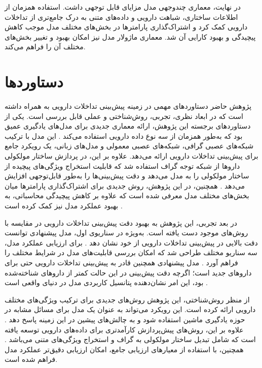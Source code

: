 در نهایت، معماری چندوجهی مدل مزایای قابل توجهی داشت. استفاده همزمان از اطلاعات ساختاری، شباهت دارویی و داده‌های متنی به درک جامع‌تری از تداخلات دارویی کمک کرد و اشتراک‌گذاری پارامترها در بخش‌های مختلف مدل موجب کاهش پیچیدگی و بهبود کارایی آن شد. معماری ماژولار مدل نیز امکان بهبود و تغییر بخش‌های مختلف آن را فراهم می‌کند.

\section{دستاوردها}

پژوهش حاضر دستاوردهای مهمی در زمینه پیش‌بینی تداخلات دارویی به همراه داشته است که در ابعاد نظری، تجربی، روش‌شناختی و عملی قابل بررسی است. یکی از دستاوردهای برجسته این پژوهش، ارائه معماری جدیدی برای مدل‌های یادگیری عمیق بود که به‌طور همزمان از سه نوع داده دارویی استفاده می‌کند \cite{ref_li2023}. این مدل با ترکیب شبکه‌های عصبی گرافی، شبکه‌های عصبی معمولی و مدل‌های زبانی، یک رویکرد جامع برای پیش‌بینی تداخلات دارویی ارائه می‌دهد. علاوه بر این، در پردازش ساختار مولکولی داروها از شبکه توجه گراف استفاده شد که قابلیت استخراج ویژگی‌های پیچیده از ساختار مولکولی را به مدل می‌دهد و دقت پیش‌بینی‌ها را به‌طور قابل‌توجهی افزایش می‌دهد \cite{ref_nyamabo2021}. همچنین، در این پژوهش، روش جدیدی برای اشتراک‌گذاری پارامترها میان بخش‌های مختلف مدل معرفی شده است که علاوه بر کاهش پیچیدگی محاسباتی، به بهبود عملکرد مدل نیز کمک کرده است \cite{ref_dai2020}.

در بعد تجربی، این پژوهش به بهبود دقت پیش‌بینی تداخلات دارویی در مقایسه با روش‌های موجود دست یافته است. به‌ویژه در سناریوی اول، مدل پیشنهادی توانست دقت بالایی در پیش‌بینی تداخلات دارویی از خود نشان دهد \cite{ref_he2023}. برای ارزیابی عملکرد مدل، سه سناریو مختلف طراحی شد که امکان بررسی قابلیت‌های مدل در شرایط مختلف را فراهم آورد \cite{ref_deng2020}. مدل پیشنهادی همچنین قادر به پیش‌بینی تداخلات دارویی حتی برای داروهای جدید است؛ اگرچه دقت پیش‌بینی در این حالت کمتر از داروهای شناخته‌شده بود، این امر نشان‌دهنده پتانسیل کاربردی مدل در دنیای واقعی است \cite{ref_shi2024}.

از منظر روش‌شناختی، این پژوهش روش‌های جدیدی برای ترکیب ویژگی‌های مختلف دارویی ارائه کرده است. این رویکرد می‌تواند به عنوان یک مدل برای مسائل مشابه در حوزه یادگیری ماشین استفاده شود و به چالش‌های پیشین در این زمینه پاسخ دهد \cite{ref_lin2022}. علاوه بر این، روش‌های پیش‌پردازش کارآمدتری برای داده‌های دارویی توسعه یافته است که شامل تبدیل ساختار مولکولی به گراف و استخراج ویژگی‌های متنی می‌باشد \cite{ref_weininger1988}. همچنین، با استفاده از معیارهای ارزیابی جامع، امکان ارزیابی دقیق‌تر عملکرد مدل فراهم شده است.

